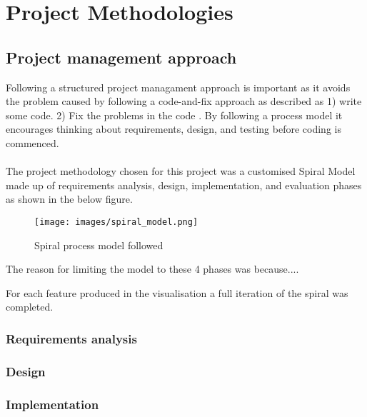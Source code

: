 
\chapter{Project Methodologies}\label{C:m}

\section{Project management approach}
Following a structured project managament approach is important as it avoids the problem caused by following a code-and-fix approach as described  as 1) write some code. 2) Fix the problems in the code \cite{boehm}. By following a process model it encourages thinking about requirements, design, and testing before coding is commenced. 
\\\\
The project methodology chosen for this project was a customised Spiral Model made up of requirements analysis, design, implementation, and evaluation phases as shown in the below figure.   
\begin{figure}[h!]
  \centering
      \texttt{[image: images/spiral\_model.png]}
  \caption{Spiral process model followed}
\end{figure}
The reason for limiting the model to these 4 phases was because....

For each feature produced in the visualisation a full iteration of the spiral was completed.
\subsection{Requirements analysis}
\subsection{Design}
\subsection{Implementation}

